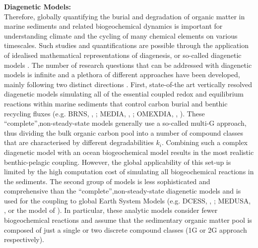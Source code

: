 \documentclass[gmd, manuscript]{copernicus}
\begin{document}
\textbf{Diagenetic Models:}\\
Therefore, globally quantifying the burial and degradation of organic matter in marine sediments and related biogeochemical dynamics is important for understanding climate and the cycling of many chemical elements on various timescales.
Such studies and quantifications are possible through the application of idealised mathematical representations of diagenesis, or so-called diagenetic models \citep[e.g.][]{berner_early_1980, boudreau1997diagenetic}.
The number of research questions that can be addressed with diagenetic models is infinite and a plethora of different approaches have been developed, mainly following two distinct directions \citep{arndt_quantifying_2013}. 
First, state-of-the art vertically resolved diagenetic models simulating all of the essential coupled redox and equilibrium reactions within marine sediments that control carbon burial and benthic recycling fluxes 
(e.g. BRNS, \citeauthor{aguilera_knowledge-based_2005}, \citeyear{aguilera_knowledge-based_2005}; 
MEDIA, \citeauthor{meysman_reactive_2003}, \citeyear{meysman_reactive_2003}; OMEXDIA, \citeauthor{soetaert_model_1996}, \citeyear{soetaert_model_1996}). These ``complete'',non-steady-state models generally use a so-called multi-G approach, 
thus dividing the bulk organic carbon pool into a number of compound classes that are characterised by different degradabilities $k_i$. Combining such a complex diagenetic model with an ocean biogeochemical model results in 
the most realistic benthic-pelagic coupling. However, the global applicability of this set-up is limited by the high computation cost of simulating all biogeochemical reactions in the sediments. 
The second group of models is less sophisticated and comprehensive than the ``complete'',non-steady-state diagenetic models and is used for the coupling to global Earth System Models 
(e.g. DCESS, \citeauthor{shaffer_presentation_2008}, \citeyear{shaffer_presentation_2008}; MEDUSA, \citeauthor{munhoven_glacialinterglacial_2007}, \citeyear{munhoven_glacialinterglacial_2007} or the model of \citet{heinze_global_1999}). 
In particular, these analytic models consider fewer biogeochemical reactions and assume that the sedimentary organic matter pool is composed 
of just a single or two discrete compound classes (1G or 2G approach respectively). \\[2ex]%
\end{document}
